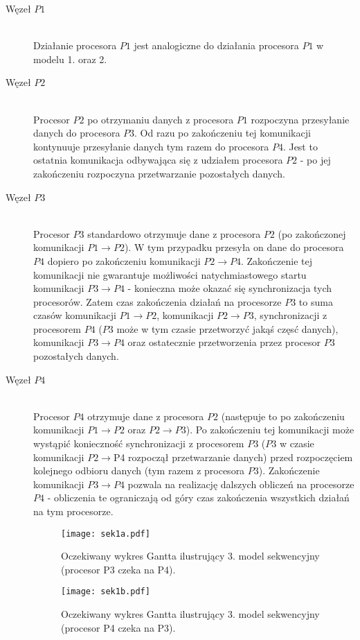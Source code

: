 \begin{description}

\item[Węzeł $P1$] \hfill \\

Działanie procesora $P1$ jest analogiczne do działania procesora $P1$ w modelu 1. oraz 2.

\item[Węzeł $P2$] \hfill \\

Procesor $P2$ po otrzymaniu danych z procesora $P1$ rozpoczyna przesyłanie danych do procesora $P3$. Od razu po zakończeniu tej komunikacji kontynuuje przesyłanie danych tym razem do procesora $P4$. Jest to ostatnia komunikacja odbywająca się z udziałem procesora $P2$ - po jej zakończeniu rozpoczyna przetwarzanie pozostałych danych.
 
\item[Węzeł $P3$] \hfill \\

Procesor $P3$ standardowo otrzymuje dane z procesora $P2$ (po zakończonej komunikacji $P1 \to P2$). W tym przypadku przesyła on dane do procesora $P4$ dopiero po zakończeniu komunikacji $P2 \to P4$. Zakończenie tej komunikacji nie gwarantuje możliwości natychmiastowego startu komunikacji $P3 \to P4$ - konieczna może okazać się synchronizacja tych procesorów. Zatem czas zakończenia działań na procesorze $P3$ to suma czasów komunikacji $P1 \to P2$, komunikacji $P2 \to P3$, synchronizacji z procesorem $P4$ ($P3$ może w tym czasie przetworzyć jakąś częsć danych), komunikacji $P3 \to P4$ oraz ostatecznie przetworzenia przez procesor $P3$ pozostałych danych.

\item[Węzeł $P4$] \hfill \\

Procesor $P4$ otrzymuje dane z procesora $P2$ (następuje to po zakończeniu komunikacji $P1 \to P2$ oraz $P2 \to P3$). Po zakończeniu tej komunikacji może wystąpić konieczność synchronizacji z procesorem $P3$ ($P3$ w czasie komunikacji $P2 \to $P4 rozpoczął przetwarzanie danych) przed rozpoczęciem kolejnego odbioru danych (tym razem z procesora $P3$). Zakończenie komunikacji $P3 \to P4$ pozwala na realizację dalszych obliczeń na procesorze $P4$ - obliczenia te ograniczają od góry czas zakończenia wszystkich działań na tym procesorze. 

\begin{figure}[!ht]
\centering
\texttt{[image: sek1a.pdf]}
\caption{Oczekiwany wykres Gantta ilustrujący 3. model sekwencyjny (procesor P3 czeka na P4).}
\label{fig:seq3a}
\end{figure}

\begin{figure}[!ht]
\centering
\texttt{[image: sek1b.pdf]}
\caption{Oczekiwany wykres Gantta ilustrujący 3. model sekwencyjny (procesor P4 czeka na P3).}
\label{fig:seq3b}
\end{figure}

\end{description}

